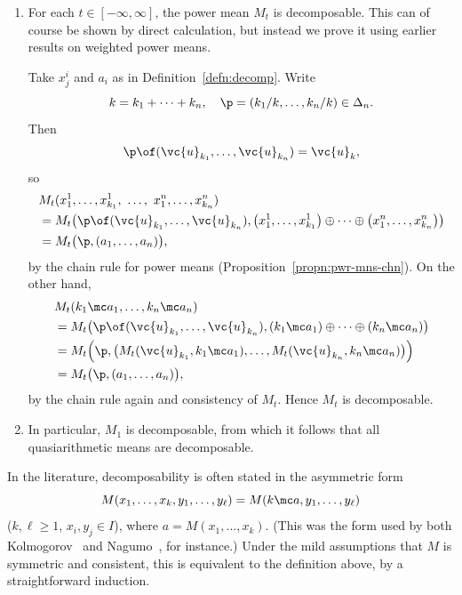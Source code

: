 \begin{examples}
\begin{enumerate}
\item 
{}
For each $t \in [-\infty, \infty]$, the power mean $M_t$ is decomposable.%
%
% 
This can of course be shown by direct calculation, but instead we
prove it using earlier results on weighted power means.

Take $x^i_j$ and $a_i$ as in Definition~\ref{defn:decomp}.  Write
\[
k = k_1 + \cdots + k_n,
\quad
\p = (k_1/k, \ldots, k_n/k) \in \Delta_n.
\]
Then 
\[
\p \of (\vc{u}_{k_1}, \ldots, \vc{u}_{k_n}) = \vc{u}_k,
\]
so
% 
\begin{align*}
&
M_t(x^1_1, \ldots, x^1_{k_1}, \ \ldots, \ x^n_1, \ldots, x^n_{k_n})     \\
&
=
M_t\bigl(
\p \of (\vc{u}_{k_1}, \ldots, \vc{u}_{k_n}),
\bigl(x^1_1, \ldots, x^1_{k_1}\bigr) 
\oplus\cdots\oplus 
\bigl(x^n_1, \ldots, x^n_{k_n}\bigr)
\bigr)  \\
&
=
M_t\bigl(
\p, (a_1, \ldots, a_n)
\bigr),
\end{align*}
% 
by the chain rule for power means (Proposition~\ref{propn:pwr-mns-chn}).
On the other hand,
% 
\begin{align*}
&
M_t(k_1 \mc a_1, \ldots, k_n \mc a_n)   \\
&
=
M_t\bigl(
\p \of (\vc{u}_{k_1}, \ldots, \vc{u}_{k_n}),
(k_1 \mc a_1) \oplus\cdots\oplus (k_n \mc a_n)
\bigr)  \\
&
=
M_t\Bigl(
\p, 
\bigl(
M_t(\vc{u}_{k_1}, k_1 \mc a_1), \ldots, M_t(\vc{u}_{k_n}, k_n \mc a_n)
\bigr)  
\Bigr)  \\
&
=
M_t\bigl(
\p, (a_1, \ldots, a_n)
\bigr),
\end{align*}
% 
by the chain rule again and consistency of $M_t$.  Hence $M_t$ is
decomposable.

\item
In particular, $M_1$ is decomposable, from which it follows that all
quasiarithmetic means are decomposable.
\end{enumerate}
\end{examples}

\begin{remark}
In the literature, decomposability is often stated in the asymmetric form 
\[
M(x_1, \ldots, x_k, y_1, \ldots, y_\ell)
=
M(k \mc a, y_1, \ldots, y_\ell)
\]
($k, \ell \geq 1$, $x_i, y_j \in I$), where $a = M(x_1, \ldots, x_k)$.
(This was the form used by both Kolmogorov~\cite{KolmSNM,KolmONM} and
Nagumo~\cite{Nagu}, for instance.)  Under the mild assumptions that $M$ is
symmetric and consistent, this is equivalent to the definition above, by a
straightforward induction.
\end{remark}

